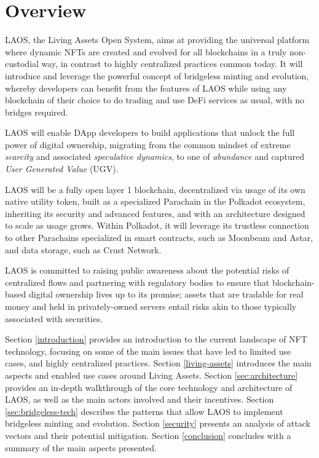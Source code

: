 \section{Overview}\label{overview}

LAOS, the Living Assets Open System,
aims at providing the universal platform where dynamic NFTs are created and evolved for all blockchains
in a truly non-custodial way, in contrast to highly centralized practices common today.
It will introduce and leverage the powerful concept of bridgeless minting and evolution, 
whereby developers can benefit from the features of LAOS while using any blockchain of their choice
to do trading and use DeFi services as usual, with no bridges required.

LAOS will enable DApp developers to build applications that unlock the full power of 
digital ownership, migrating from the common mindset of extreme {\it scarcity} and associated {\it speculative dynamics}, 
to one of {\it abundance} and captured {\it User Generated Value} (UGV).

LAOS will be a fully open layer 1 blockchain, decentralized via usage of its own native utility token,
built as a specialized Parachain in the Polkadot
ecosystem, inheriting its security and advanced features, and with an architecture
designed to scale as usage grows. Within Polkadot, it will leverage its trustless connection
to other Parachains specialized in smart contracts, such as Moonbeam and Astar,
and data storage, such as Crust Network.

LAOS is committed to raising public awareness about the potential risks of centralized flows
and partnering with regulatory bodies to ensure that blockchain-based
digital ownership lives up to its promise; assets that are tradable
for real money and held in privately-owned servers entail
risks akin to those typically associated with securities.

Section \ref{introduction} provides an introduction to the current landscape of NFT technology,
focusing on some of the main issues that have led to limited use cases, and highly centralized
practices. 
Section \ref{living-assets} introduces the main aspects and enabled use cases around
Living Assets.
%
Section \ref{sec:architecture} provides an in-depth walkthrough of the core 
technology and architecture of LAOS, as well as the main actors involved and their incentives.
Section \ref{sec:bridgeless-tech} describes the patterns that allow LAOS to implement
bridgeless minting and evolution. 
%
Section \ref{security} presents an analysis of attack vectors and their
potential mitigation. 
%
Section \ref{conclusion} concludes with a summary
of the main aspects presented.